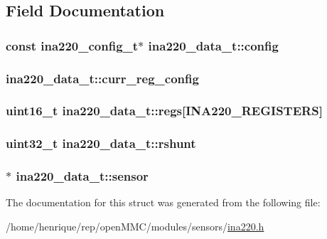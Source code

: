 \subsection{Field Documentation}
\hypertarget{structina220__data__t_a7317d63abff33be7841c2bc1c559758d}{
\subsubsection[{config}]{\setlength{\rightskip}{0pt plus 5cm}const {\bf ina220\-\_\-config\-\_\-t}$\ast$ ina220\-\_\-data\-\_\-t\-::config}}\label{structina220__data__t_a7317d63abff33be7841c2bc1c559758d}
\hypertarget{structina220__data__t_a745545113f33db1b66ea2af9c3c40013}{
\subsubsection[{curr\-\_\-reg\-\_\-config}]{ ina220\-\_\-data\-\_\-t\-::curr\-\_\-reg\-\_\-config}}\label{structina220__data__t_a745545113f33db1b66ea2af9c3c40013}
\hypertarget{structina220__data__t_a21bfa527de4daa7f1ac60e31ba3d89f6}{
\subsubsection[{regs}]{\setlength{\rightskip}{0pt plus 5cm}uint16\-\_\-t ina220\-\_\-data\-\_\-t\-::regs\mbox{[}{\bf I\-N\-A220\-\_\-\-R\-E\-G\-I\-S\-T\-E\-R\-S}\mbox{]}}}\label{structina220__data__t_a21bfa527de4daa7f1ac60e31ba3d89f6}
\hypertarget{structina220__data__t_a511c78dab60e5481576b4e7adfe81356}{
\subsubsection[{rshunt}]{\setlength{\rightskip}{0pt plus 5cm}uint32\-\_\-t ina220\-\_\-data\-\_\-t\-::rshunt}}\label{structina220__data__t_a511c78dab60e5481576b4e7adfe81356}
\hypertarget{structina220__data__t_a85ddc5c273af09f18918bd65bdeda59c}{
\subsubsection[{sensor}]{$\ast$ ina220\-\_\-data\-\_\-t\-::sensor}}\label{structina220__data__t_a85ddc5c273af09f18918bd65bdeda59c}


The documentation for this struct was generated from the following file\-:\begin{DoxyCompactItemize}
\item 
/home/henrique/rep/open\-M\-M\-C/modules/sensors/\hyperlink{ina220_8h}{ina220.\-h}\end{DoxyCompactItemize}
